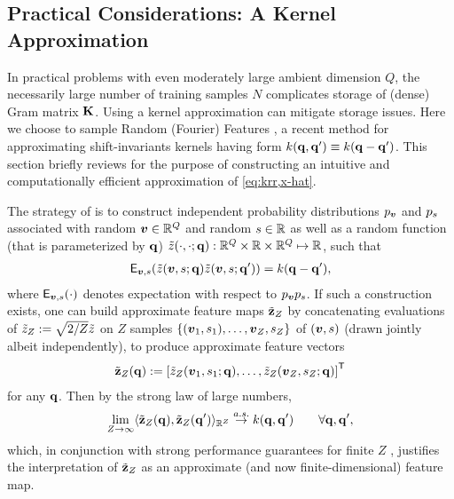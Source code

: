 \subsection{Practical Considerations: A Kernel Approximation}
\label{ss,krr,meth,apprx}

In practical problems
with even moderately large ambient dimension $Q$,
the necessarily large number of training samples $N$ 
complicates storage of (dense) Gram matrix $\mathbf{K}$.
Using a kernel approximation 
can mitigate storage issues.
Here we choose
to sample Random (Fourier) Features \cite{rahimi:07:rff},
a recent method 
for approximating shift-invariants kernels
having form $k\paren{\bmq,\bmq'} \equiv k\paren{\bmq-\bmq'}$.
This section briefly reviews \cite{rahimi:07:rff}
for the purpose of constructing 
an intuitive and computationally efficient approximation of \eqref{eq:krr,x-hat}.

The strategy of \cite{rahimi:07:rff}
is to construct independent probability distributions 
$p_{\boldsymbol{v}}$ and $p_{s}$
associated with
random $\boldsymbol{v} \in \mathbb{R}^{Q}$ 
and random $s \in \mathbb{R}$ 
as well as a random function 
(that is parameterized by $\mathbf{q}$) 
$\zt\paren{\cdot,\cdot;\bmq} : \reals{Q} \times \real \times \reals{Q} \mapsto \real$,
such that
\begin{align}
	\expect{\bmv,s}{
		\zta{\bmv,s;\bmq}
		\zta{\bmv,s;\bmq'} 
	}
	= k(\bmq-\bmq'),
	\label{eq:krr,exp}
\end{align}
where 
$\expect{\bmv,s}{\cdot}$
denotes expectation with respect to $p_{\boldsymbol{v}}p_{s}$.
If such a construction exists,
one can build
approximate feature maps $\tilde{\mathbf{z}}_Z$
by concatenating evaluations of 
$\tilde{z}_Z:= \sqrt{2/Z}\tilde{z}$ on 
$Z$ samples 
$\set{\paren{\bmv_1,s_1},\dots,\bmv_Z,s_Z}$
of $\paren{\bmv,s}$
(drawn jointly albeit independently),
to produce approximate feature vectors
\begin{align}
	\bmztZa{\bmq} := \brac{\ztZa{\bmv_1,s_1;\bmq},\dots,\ztZa{\bmv_Z,s_Z;\bmq}}\tpose
	\label{eq:krr,feat}
\end{align}
for any $\mathbf{q}$. 
Then by the strong law of large numbers,
\begin{align}
	\lim_{Z \to \infty} \innprod{
		\bmztZa{\bmq}}{
		\bmztZa{\bmq'}
	}_{\reals{Z}} \overset{a.s.}{\to} k(\bmq,\bmq') \qquad \forall \bmq,\bmq',
	\label{eq:krr,lln}
\end{align}
which, 
in conjunction 
with strong performance guarantees
for finite $Z$ \cite{rahimi:07:rff}, 
justifies the interpretation 
of $\tilde{\mathbf{z}}_Z$ as an approximate 
(and now finite-dimensional) feature map.

